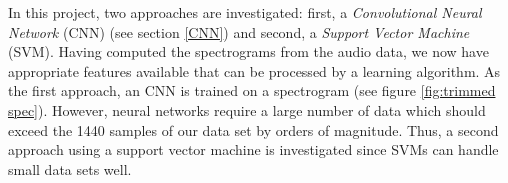 \documentclass[11pt,a4paper,twoside]{article}
\theoremstyle{thmbreak}
\numberwithin{Theorem}{subsection}
\theoremstyle{defbreak}
\theoremstyle{remark}
\theoremstyle{remark}
\begin{document}



In this project, two approaches are investigated: first, a \textit{Convolutional Neural Network} (CNN) (see section \ref{CNN}) and  second, a \textit{Support Vector Machine } (SVM). 
Having computed the spectrograms from the audio data, we now have appropriate features available that can be processed by a learning algorithm.
As the first approach, an CNN is trained on a spectrogram (see figure \ref{fig:trimmed spec}). 
However, neural networks require a large number of data which should exceed the 1440 samples of our data set by orders of magnitude. Thus, a second approach using a support vector machine is investigated since SVMs can handle small data sets well. 
\end{document}
